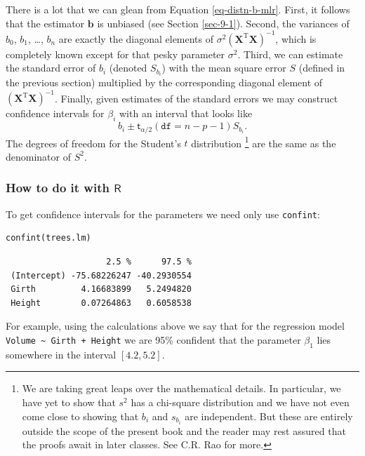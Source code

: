 \documentclass[captions=tableheading]{scrbook}
\begin{document}
There is a lot that we can glean from Equation \ref{eq-distn-b-mlr}. First, it follows that the estimator \(\mathbf{b}\) is unbiased (see Section \ref{sec-9-1}). Second, the variances of \(b_{0}\), \(b_{1}\), \ldots{}, \(b_{n}\) are exactly the diagonal elements of \(\sigma^{2}\left(\mathbf{X}^{\mathrm{T}}\mathbf{X}\right)^{-1}\), which is completely known except for that pesky parameter \(\sigma^{2}\). Third, we can estimate the standard error of \(b_{i}\) (denoted \(S_{b_{i}}\)) with the mean square error \(S\) (defined in the previous section) multiplied by the corresponding diagonal element of \(\left(\mathbf{X}^{\mathrm{T}}\mathbf{X}\right)^{-1}\). Finally, given estimates of the standard errors we may construct confidence intervals for \(\beta_{i}\) with an interval that looks like
\begin{equation}
b_{i}\pm\mathsf{t}_{\alpha/2}(\mathtt{df}=n-p-1)S_{b_{i}}.
\end{equation}
The degrees of freedom for the Student's \(t\) distribution
\footnote{We are taking great leaps over the mathematical details. In particular, we have yet to show that \(s^{2}\) has a chi-square distribution and we have not even come close to showing that \(b_{i}\) and \(s_{b_{i}}\) are independent. But these are entirely outside the scope of the present book and the reader may rest assured that the proofs await in later classes. See C.R. Rao for more.}
are the same as the denominator of \(S^{2}\). 
\subsubsection{How to do it with \(\mathsf{R}\)}
\label{sec-12-2-4-1}


To get confidence intervals for the parameters we need only use \texttt{confint}:


\begin{verbatim}
confint(trees.lm)
\end{verbatim}

\begin{verbatim}
                    2.5 %      97.5 %
 (Intercept) -75.68226247 -40.2930554
 Girth         4.16683899   5.2494820
 Height        0.07264863   0.6058538
\end{verbatim}



For example, using the calculations above we say that for the regression model \texttt{Volume \textasciitilde{} Girth + Height} we are 95\% confident that the parameter \(\beta_{1}\) lies somewhere in the interval \( [  4.2,  5.2 ] \).
\end{document}
